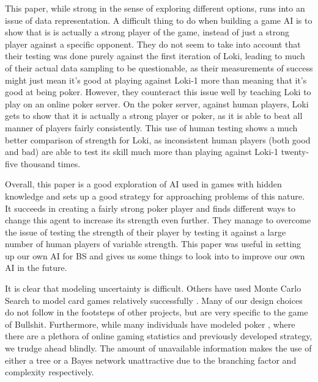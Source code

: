 \documentclass[a4paper,11pt]{article}
\begin{document}
	This paper, while strong in the sense of exploring different options, runs into an issue of data representation. A difficult thing to do when building a game AI is to show that is is actually a strong player of the game, instead of just a strong player against a specific opponent. They do not seem to take into account that their testing was done purely against the first iteration of Loki, leading to much of their actual data sampling to be questionable, as their measurements of success might just mean it’s good at playing against Loki-1 more than meaning that it’s good at being poker. However, they counteract this issue well by teaching Loki to play on an online poker server. On the poker server, against human players, Loki gets to show that it is actually a strong player or poker, as it is able to beat all manner of players fairly consistently. This use of human testing shows a much better comparison of strength for Loki, as inconsistent human players (both good and bad) are able to test its skill much more than playing against Loki-1 twenty-five thousand times.

	Overall, this paper is a good exploration of AI used in games with hidden knowledge and sets up a good strategy for approaching problems of this nature. It succeeds in creating a fairly strong poker player and finds different ways to change this agent to increase its strength even further. They manage to overcome the issue of testing the strength of their player by testing it against a large number of human players of variable strength. This paper was useful in setting up our own AI for BS and gives us some things to look into to improve our own AI in the future.

It is clear that modeling uncertainty is difficult\cite{koller}. Others have used Monte Carlo Search to model card games relatively successfully \cite{van}. Many of our design choices do not follow in the footsteps of other projects, but are very specific to the game of Bullshit. Furthermore, while many individuals have modeled poker \cite{van} \cite{billings} , where there are a plethora of online gaming statistics and previously developed strategy, we trudge ahead blindly. The amount of unavailable information makes the use of either a tree \cite{slantchev} or a Bayes network \cite{milch} unattractive due to the branching factor and complexity respectively.
\end{document}
